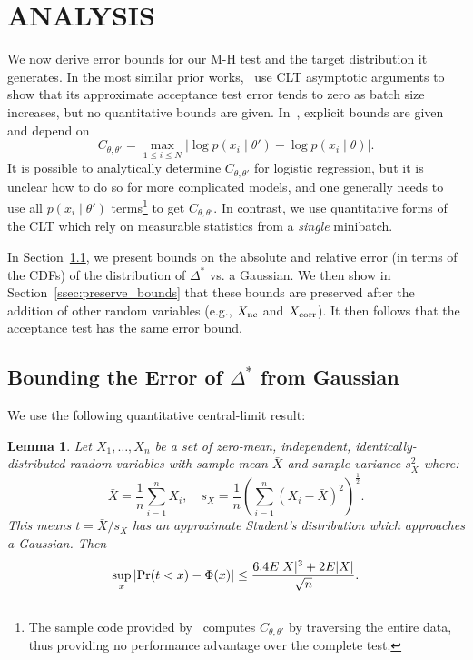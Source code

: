 \documentclass[twoside]{article} \usepackage{aistats2017}
\newtheorem{lemma}{Lemma}
\begin{document}
\section{ANALYSIS}\label{sec:analysis}

We now derive error bounds for our M-H test and the target distribution it
generates. In the most similar prior works,~\citet{cutting_mh_2014} use CLT
asymptotic arguments to show that its approximate acceptance test error tends to
zero as batch size increases, but no quantitative bounds are given.
In~\citet{icml2014c1_bardenet14}, explicit bounds are given and depend on
\begin{equation}\label{eq:bad_bound}
    C_{\theta, \theta'} = \max_{1\leq i\leq N}|\log p(x_i\mid\theta') - \log p(x_i\mid\theta)|.
\end{equation}
It is possible to analytically determine $C_{\theta,\theta'}$ for logistic
regression, but it is unclear how to do so for more complicated models, and one
generally needs to use all $p(x_i\mid \theta')$ terms\footnote{The sample code
provided by~\citet{icml2014c1_bardenet14} computes $C_{\theta,\theta'}$
by traversing the entire data, thus providing no performance advantage over the
complete test.} to get $C_{\theta,\theta'}$.  In contrast, we use quantitative
forms of the CLT which rely on measurable statistics from a \emph{single}
minibatch.

In Section~\ref{ssec:delta_star_distribution}, we present bounds on the absolute
and relative error (in terms of the CDFs) of the distribution of $\Delta^*$ vs.
a Gaussian. We then show in Section~\ref{ssec:preserve_bounds} that these bounds
are preserved after the addition of other random variables (e.g., $X_{\rm nc}$
and $X_{\rm corr}$). It then follows that the acceptance test has the same error
bound.

\subsection{Bounding the Error of $\Delta^*$ from Gaussian}\label{ssec:delta_star_distribution}

We use the following quantitative central-limit result:
  
\begin{lemma}\label{lem:quant_clt}
Let $X_1,\ldots,X_n$ be a set of zero-mean, independent, identically-distributed
random variables with sample mean $\bar{X}$ and sample variance $s^2_X$
where:
\begin{equation}
    \bar{X} = \frac{1}{n}\sum_{i=1}^nX_i, \quad s_X = \frac{1}{n}\left(\sum_{i=1}^n(X_i-\bar{X})^2\right)^{\frac{1}{2}}.
\end{equation}
This means $t=\bar{X}/s_X$ has an approximate Student's distribution
which approaches a Gaussian. Then
\begin{equation}\label{eq:clt-bounds}
    \sup_x|{\rm Pr}(t<x) - \Phi(x)| \leq \frac{6.4E|X|^3+2E|X|}{\sqrt{n}}.
\end{equation}
\end{lemma}
\end{document}
